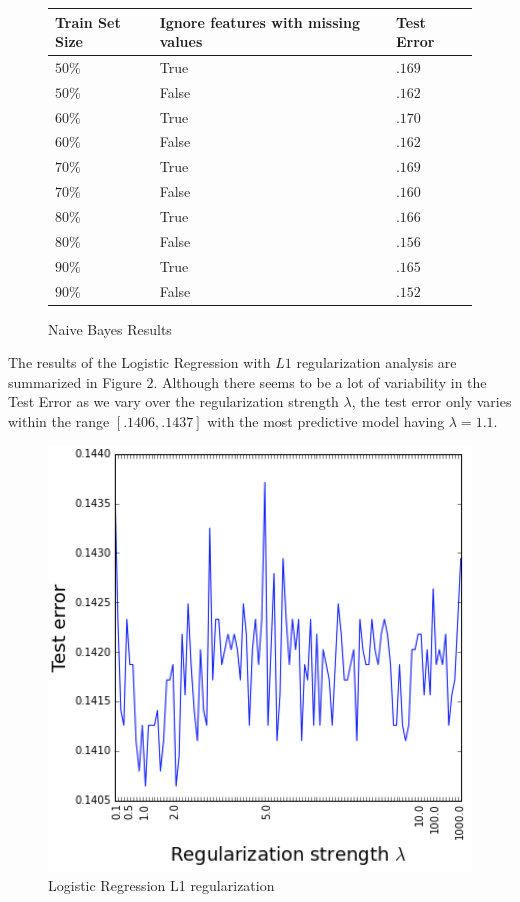\documentclass[11pt, oneside]{article}   	%
\begin{document}
\begin{figure}[!ht]
\caption{Naive Bayes Results}

\begin{center}
\begin{tabular}{ l | l || l }
    \hline
    Train Set Size & Ignore features with missing values & Test Error \\ \hline
    $50$\% & True & $.169$   \\ \hline
    $50$\% & False &  $.162$     \\ \hline
    $60$\% & True &  $.170$    \\ \hline
    $60$\% & False &  $.162$     \\ \hline
    $70$\% & True &  $.169$     \\ \hline
    $70$\% & False &  $.160$     \\ \hline
    $80$\% & True &  $.166$     \\ \hline
    $80$\% & False &  $.156$     \\ \hline
    $90$\% & True &  $.165$     \\ \hline
    $90$\% & False &  $.152$     \\ \hline
\end{tabular}
\end{center}
\end{figure}

The results of the Logistic Regression with $L1$ regularization analysis are summarized in Figure $2$.  Although there seems to be a lot of variability in the Test Error as we vary over the regularization strength $ \lambda $, the test error only varies within the range $ [.1406, .1437]$ with the most predictive model having $ \lambda = 1.1$.

\begin{figure}[H]
\caption{Logistic Regression L1 regularization}
\begin{center}
  \includegraphics[scale=.5]{logistic_regression_l1}
\end{center}
\end{figure}
\end{document}
